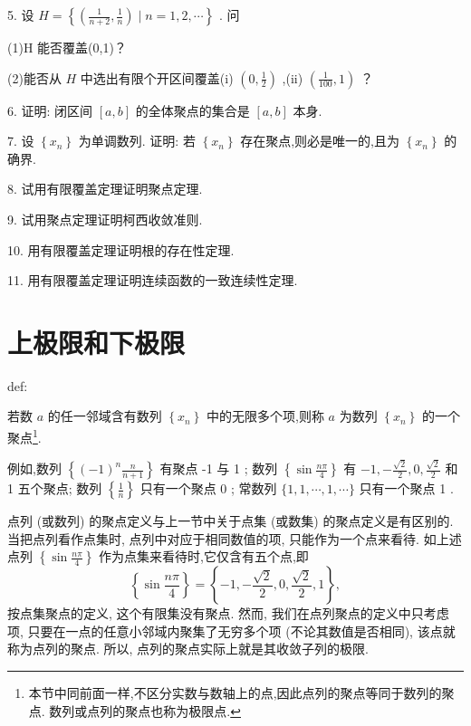 5. 设 \(H = \left\{  {\left( {\frac{1}{n + 2},\frac{1}{n}}\right)  \mid  n = 1,2,\cdots }\right\}\) . 问

(1)H 能否覆盖(0,1)？

(2)能否从 \(H\) 中选出有限个开区间覆盖(i) \(\left( {0,\frac{1}{2}}\right)\) ,(ii) \(\left( {\frac{1}{100},1}\right)\) ？

6. 证明: 闭区间 \(\left\lbrack  {a,b}\right\rbrack\) 的全体聚点的集合是 \(\left\lbrack  {a,b}\right\rbrack\) 本身.

7. 设 \(\left\{  {x}_{n}\right\}\) 为单调数列. 证明: 若 \(\left\{  {x}_{n}\right\}\) 存在聚点,则必是唯一的,且为 \(\left\{  {x}_{n}\right\}\) 的确界.

8. 试用有限覆盖定理证明聚点定理.

9. 试用聚点定理证明柯西收敛准则.

10. 用有限覆盖定理证明根的存在性定理.

11. 用有限覆盖定理证明连续函数的一致连续性定理.

\section{上极限和下极限}

\begin{definition}{}{def:}

\end{definition}
若数 \(a\) 的任一邻域含有数列 \(\left\{  {x}_{n}\right\}\) 中的无限多个项,则称 \(a\) 为数列 \(\left\{  {x}_{n}\right\}\) 的一个聚点\footnote{本节中同前面一样,不区分实数与数轴上的点,因此点列的聚点等同于数列的聚点. 数列或点列的聚点也称为极限点.}.

例如,数列 \(\left\{  {{\left( -1\right) }^{n}\frac{n}{n + 1}}\right\}\) 有聚点 -1 与 1 ; 数列 \(\left\{  {\sin \frac{n\pi }{4}}\right\}\) 有 \(- 1, - \frac{\sqrt{2}}{2},0,\frac{\sqrt{2}}{2}\) 和 1 五个聚点; 数列 \(\left\{  \frac{1}{n}\right\}\) 只有一个聚点 0 ; 常数列 \(\{ 1,1,\cdots ,1,\cdots \}\) 只有一个聚点 1 .

\begin{remark}

\end{remark}
点列 (或数列) 的聚点定义与上一节中关于点集 (或数集) 的聚点定义是有区别的. 当把点列看作点集时, 点列中对应于相同数值的项, 只能作为一个点来看待. 如上述点列 \(\left\{  {\sin \frac{n\pi }{4}}\right\}\) 作为点集来看待时,它仅含有五个点,即
\[
\left\{  {\sin \frac{n\pi }{4}}\right\}   = \left\{  {-1, - \frac{\sqrt{2}}{2},0,\frac{\sqrt{2}}{2},1}\right\}  ,
\]
按点集聚点的定义, 这个有限集没有聚点. 然而, 我们在点列聚点的定义中只考虑项, 只要在一点的任意小邻域内聚集了无穷多个项 (不论其数值是否相同), 该点就称为点列的聚点. 所以, 点列的聚点实际上就是其收敛子列的极限.

